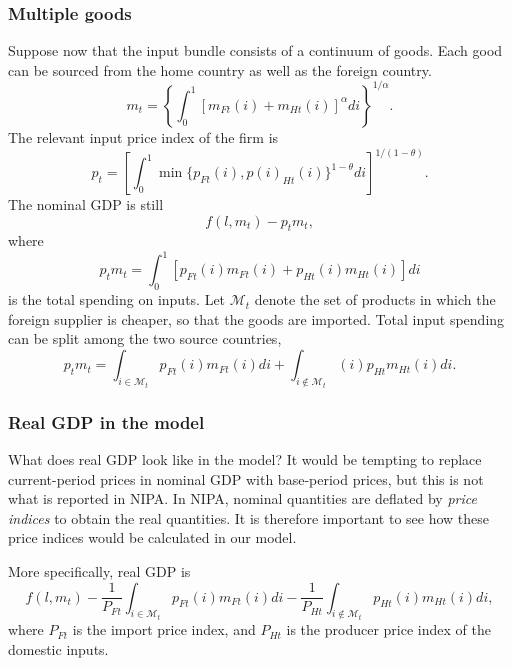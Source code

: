 \documentclass[12pt]{article}
\begin{document}
\subsubsection{Multiple goods}

Suppose now that the input bundle consists of a continuum of goods. Each
good can be sourced from the home country as well as the foreign country. 
\begin{equation*}
m_{t}=\left\{ \int_{0}^{1}[m_{Ft}(i)+m_{Ht}(i)]^{\alpha }di\right\}
^{1/\alpha }.
\end{equation*}%
The relevant input price index of the firm is 
\begin{equation*}
p_{t}=\left[ \int_{0}^{1}\min \{p_{Ft}(i),p(i)_{Ht}(i)\}^{1-\theta }di\right]
^{1/(1-\theta )}.
\end{equation*}%
The nominal GDP is still 
\begin{equation*}
f(l,m_{t})-p_{t}m_{t},
\end{equation*}%
where 
\begin{equation*}
p_{t}m_{t}=\int_{0}^{1}[p_{Ft}(i)m_{Ft}(i)+p_{Ht}(i)m_{Ht}(i)]di
\end{equation*}%
is the total spending on inputs. Let $\mathcal{M}_{t}$ denote the set of
products in which the foreign supplier is cheaper, so that the goods are
imported. Total input spending can be split among the two source countries, 
\begin{equation*}
p_{t}m_{t}=\int_{i\in \mathcal{M}_{t}}p_{Ft}(i)m_{Ft}(i)di+\int_{i\not\in 
\mathcal{M}_{t}}(i)p_{Ht}m_{Ht}(i)di.
\end{equation*}

\subsubsection{Real GDP in the model}

What does real GDP look like in the model? It would be tempting to replace
current-period prices in nominal GDP with base-period prices, but this is
not what is reported in NIPA. In NIPA, nominal quantities are deflated by 
\emph{price indices} to obtain the real quantities. It is therefore
important to see how these price indices would be calculated in our model.

More specifically, real GDP is 
\begin{equation*}
f(l,m_t)-\frac1{P_{Ft}}\int_{i\in\mathcal{M}_t}p_{Ft}(i)m_{Ft}(i)di
-\frac1{P_{Ht}}\int_{i\not\in\mathcal{M}_t}p_{Ht}(i)m_{Ht}(i)di,
\end{equation*}
where $P_{Ft}$ is the import price index, and $P_{Ht}$ is the producer price
index of the domestic inputs.
\end{document}
